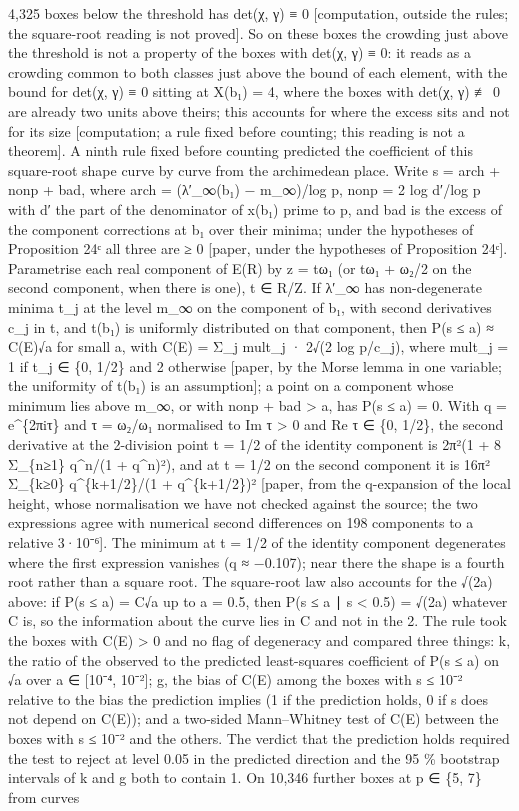 \documentclass[11pt,a4paper]{article}
\theoremstyle{named}
\begin{document}
4,325 boxes below the threshold has det(χ, γ) ≡ 0 [computation, outside the rules; the square-root reading is not proved]. So on these boxes the crowding just above the threshold is not a property of the boxes with det(χ, γ) ≡ 0: it reads as a crowding common to both classes just above the bound of each element, with the bound for det(χ, γ) ≡ 0 sitting at X(b₁) = 4, where the boxes with det(χ, γ) ≢ 0 are already two units above theirs; this accounts for where the excess sits and not for its size [computation; a rule fixed before counting; this reading is not a theorem]. A ninth rule fixed before counting predicted the coefficient of this square-root shape curve by curve from the archimedean place. Write s = arch + nonp + bad, where arch = (λ′\_∞(b₁) − m\_∞)/log p, nonp = 2 log d′/log p with d′ the part of the denominator of x(b₁) prime to p, and bad is the excess of the component corrections at b₁ over their minima; under the hypotheses of Proposition 24ᶜ all three are ≥ 0 [paper, under the hypotheses of Proposition 24ᶜ]. Parametrise each real component of E(R) by z = tω₁ (or tω₁ + ω₂/2 on the second component, when there is one), t ∈ R/Z. If λ′\_∞ has non-degenerate minima t\_j at the level m\_∞ on the component of b₁, with second derivatives c\_j in t, and t(b₁) is uniformly distributed on that component, then P(s ≤ a) ≈ C(E)√a for small a, with C(E) = Σ\_j mult\_j · 2√(2 log p/c\_j), where mult\_j = 1 if t\_j ∈ \{0, 1/2\} and 2 otherwise [paper, by the Morse lemma in one variable; the uniformity of t(b₁) is an assumption]; a point on a component whose minimum lies above m\_∞, or with nonp + bad \textgreater{} a, has P(s ≤ a) = 0. With q = e\textasciicircum{}\{2πiτ\} and τ = ω₂/ω₁ normalised to Im τ \textgreater{} 0 and Re τ ∈ \{0, 1/2\}, the second derivative at the 2-division point t = 1/2 of the identity component is 2π²(1 + 8 Σ\_\{n≥1\} q\textasciicircum{}n/(1 + q\textasciicircum{}n)²), and at t = 1/2 on the second component it is 16π² Σ\_\{k≥0\} q\textasciicircum{}\{k+1/2\}/(1 + q\textasciicircum{}\{k+1/2\})² [paper, from the q-expansion of the local height, whose normalisation we have not checked against the source; the two expressions agree with numerical second differences on 198 components to a relative 3·10⁻⁶]. The minimum at t = 1/2 of the identity component degenerates where the first expression vanishes (q ≈ −0.107); near there the shape is a fourth root rather than a square root. The square-root law also accounts for the √(2a) above: if P(s ≤ a) = C√a up to a = 0.5, then P(s ≤ a ∣ s \textless{} 0.5) = √(2a) whatever C is, so the information about the curve lies in C and not in the 2. The rule took the boxes with C(E) \textgreater{} 0 and no flag of degeneracy and compared three things: k, the ratio of the observed to the predicted least-squares coefficient of P(s ≤ a) on √a over a ∈ [10⁻⁴, 10⁻²]; g, the bias of C(E) among the boxes with s ≤ 10⁻² relative to the bias the prediction implies (1 if the prediction holds, 0 if s does not depend on C(E)); and a two-sided Mann–Whitney test of C(E) between the boxes with s ≤ 10⁻² and the others. The verdict that the prediction holds required the test to reject at level 0.05 in the predicted direction and the 95 \% bootstrap intervals of k and g both to contain 1. On 10,346 further boxes at p ∈ \{5, 7\} from curves 
\end{document}
